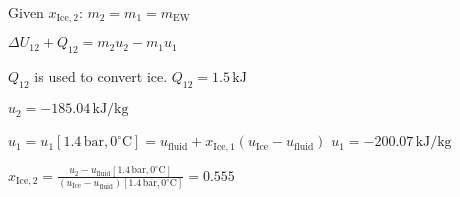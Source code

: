 Given \( x_{\text{Ice},2} \):  
\( m_2 = m_1 = m_{\text{EW}} \)  

\( \Delta U_{12} + Q_{12} = m_2 u_2 - m_1 u_1 \)  

\( Q_{12} \) is used to convert ice.  
\( Q_{12} = 1.5 \, \text{kJ} \)  

\( u_2 = -185.04 \, \text{kJ/kg} \)  

\( u_1 = u_1[1.4 \, \text{bar}, 0^\circ \text{C}] = u_{\text{fluid}} + x_{\text{Ice},1}(u_{\text{Ice}} - u_{\text{fluid}}) \)  
\( u_1 = -200.07 \, \text{kJ/kg} \)  

\( x_{\text{Ice},2} = \frac{u_2 - u_{\text{fluid}}[1.4 \, \text{bar}, 0^\circ \text{C}]}{(u_{\text{Ice}} - u_{\text{fluid}})[1.4 \, \text{bar}, 0^\circ \text{C}]} = 0.555 \)